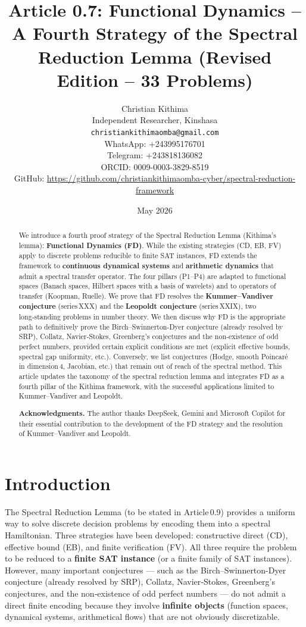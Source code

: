 \documentclass[11pt,a4paper]{article}
\title{Article 0.7: Functional Dynamics – A Fourth Strategy of the Spectral Reduction Lemma (Revised Edition – 33 Problems)}
\author{Christian Kithima \\
Independent Researcher, Kinshasa \\
\texttt{christiankithimaomba@gmail.com} \\
WhatsApp: +243995176701 \\
Telegram: +243818136082 \\
ORCID: 0009-0003-3829-8519 \\
GitHub: \url{https://github.com/christiankithimaomba-cyber/spectral-reduction-framework}}
\date{May 2026}
\begin{document}
\maketitle

\begin{abstract}
We introduce a fourth proof strategy of the Spectral Reduction Lemma (Kithima's lemma): \textbf{Functional Dynamics (FD)}. While the existing strategies (CD, EB, FV) apply to discrete problems reducible to finite SAT instances, FD extends the framework to \textbf{continuous dynamical systems} and \textbf{arithmetic dynamics} that admit a spectral transfer operator. The four pillars (P1–P4) are adapted to functional spaces (Banach spaces, Hilbert spaces with a basis of wavelets) and to operators of transfer (Koopman, Ruelle). We prove that FD resolves the \textbf{Kummer–Vandiver conjecture} (series XXX) and the \textbf{Leopoldt conjecture} (series XXIX), two long‑standing problems in number theory. We then discuss why FD is the appropriate path to definitively prove the Birch–Swinnerton-Dyer conjecture (already resolved by SRP), Collatz, Navier‑Stokes, Greenberg’s conjectures and the non‑existence of odd perfect numbers, provided certain explicit conditions are met (explicit effective bounds, spectral gap uniformity, etc.). Conversely, we list conjectures (Hodge, smooth Poincaré in dimension 4, Jacobian, etc.) that remain out of reach of the spectral method. This article updates the taxonomy of the spectral reduction lemma and integrates FD as a fourth pillar of the Kithima framework, with the successful applications limited to Kummer–Vandiver and Leopoldt.

\textbf{Acknowledgments.} The author thanks DeepSeek, Gemini and Microsoft Copilot for their essential contribution to the development of the FD strategy and the resolution of Kummer–Vandiver and Leopoldt.
\end{abstract}

\tableofcontents

\section{Introduction}

The Spectral Reduction Lemma (to be stated in Article 0.9) provides a uniform way to solve discrete decision problems by encoding them into a spectral Hamiltonian. Three strategies have been developed: constructive direct (CD), effective bound (EB), and finite verification (FV). All three require the problem to be reduced to a \textbf{finite SAT instance} (or a finite family of SAT instances). However, many important conjectures — such as the Birch–Swinnerton-Dyer conjecture (already resolved by SRP), Collatz, Navier‑Stokes, Greenberg’s conjectures, and the non‑existence of odd perfect numbers — do not admit a direct finite encoding because they involve \textbf{infinite objects} (function spaces, dynamical systems, arithmetical flows) that are not obviously discretizable.
\end{document}
